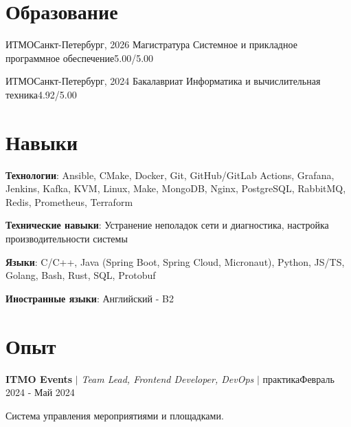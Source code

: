 \documentclass[letterpaper,11pt]{article}
\begin{document}
\section{Образование}
\resumeSubHeadingListStart
  \resumeSubheading
    {ИТМО}{Санкт-Петербург, 2026}
    {Магистратура Системное и прикладное программное обеспечение}{5.00/5.00}

  \resumeSubheading
    {ИТМО}{Санкт-Петербург, 2024}
    {Бакалавриат Информатика и вычислительная техника}{4.92/5.00}

\resumeSubHeadingListEnd

\section{Навыки}
\resumeSubHeadingListStart
  \small{\item{
    \textbf{Технологии}{: Ansible, CMake, Docker, Git, GitHub/GitLab Actions, Grafana, Jenkins, Kafka, KVM, Linux, Make, MongoDB, Nginx, PostgreSQL, RabbitMQ, Redis, Prometheus, Terraform }

    \textbf{Технические навыки}{: Устранение неполадок сети и диагностика, настройка производительности системы}

   \textbf{Языки}{: C/C++, Java (Spring Boot, Spring Cloud, Micronaut), Python, JS/TS, Golang, Bash, Rust, SQL, Protobuf }

   \textbf{Иностранные языки}{: Английский - B2}%
  }}
\resumeSubHeadingListEnd

\section{Опыт}
\resumeSubHeadingListStart
  \resumeExperienceHeading
    {\textbf{ITMO Events} $|$ \footnotesize\emph{Team Lead, Frontend Developer, DevOps} $|$ практика}{Февраль 2024 - Май 2024}

    {\vspace{-10pt}\small Система управления мероприятиями и площадками.\vspace{-7pt}}

  \resumeItemListStart
  \resumeItemListEnd
\end{document}
